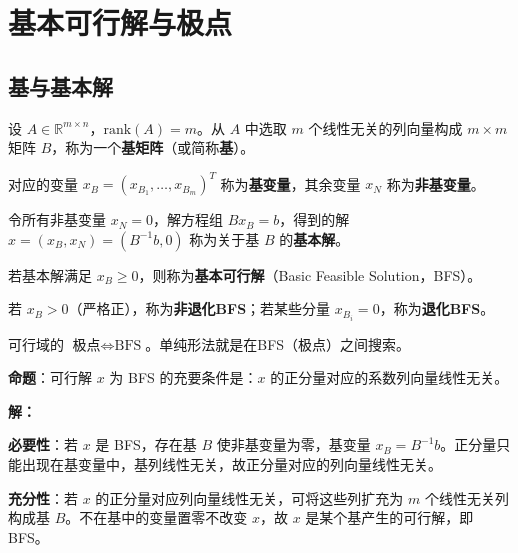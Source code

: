 \section{基本可行解与极点}\label{sec:bfs}

\subsection{基与基本解}

\begin{definition}[基（Basis）]
设 $A \in \mathbb{R}^{m \times n}$，$\text{rank}(A) = m$。从 $A$ 中选取 $m$ 个线性无关的列向量构成 $m \times m$ 矩阵 $B$，称为一个\textbf{基矩阵}（或简称\textbf{基}）。

对应的变量 $x_B = (x_{B_1}, \ldots, x_{B_m})^T$ 称为\textbf{基变量}，其余变量 $x_N$ 称为\textbf{非基变量}。
\end{definition}

\begin{definition}
令所有非基变量 $x_N = 0$，解方程组 $Bx_B = b$，得到的解 $x = (x_B, x_N) = (B^{-1}b, 0)$ 称为关于基 $B$ 的\textbf{基本解}。
\end{definition}

\begin{definition}
若基本解满足 $x_B \geq 0$，则称为\textbf{基本可行解}（Basic Feasible Solution，BFS）。

若 $x_B > 0$（严格正），称为\textbf{非退化BFS}；若某些分量 $x_{B_i} = 0$，称为\textbf{退化BFS}。
\end{definition}

\begin{conceptbox}[BFS与极点的关系]
可行域的 $\text{极点} \Leftrightarrow \text{BFS}$。单纯形法就是在BFS（极点）之间搜索。
\end{conceptbox}

\begin{example}[基本可行解的充要条件]\label{ex:bfs-condition}
\textbf{命题}：可行解 $x$ 为 BFS 的充要条件是：$x$ 的正分量对应的系数列向量线性无关。

\textbf{解：}

\textbf{必要性}：若 $x$ 是 BFS，存在基 $B$ 使非基变量为零，基变量 $x_B = B^{-1}b$。正分量只能出现在基变量中，基列线性无关，故正分量对应的列向量线性无关。

\textbf{充分性}：若 $x$ 的正分量对应列向量线性无关，可将这些列扩充为 $m$ 个线性无关列构成基 $B$。不在基中的变量置零不改变 $x$，故 $x$ 是某个基产生的可行解，即 BFS。
\end{example}

